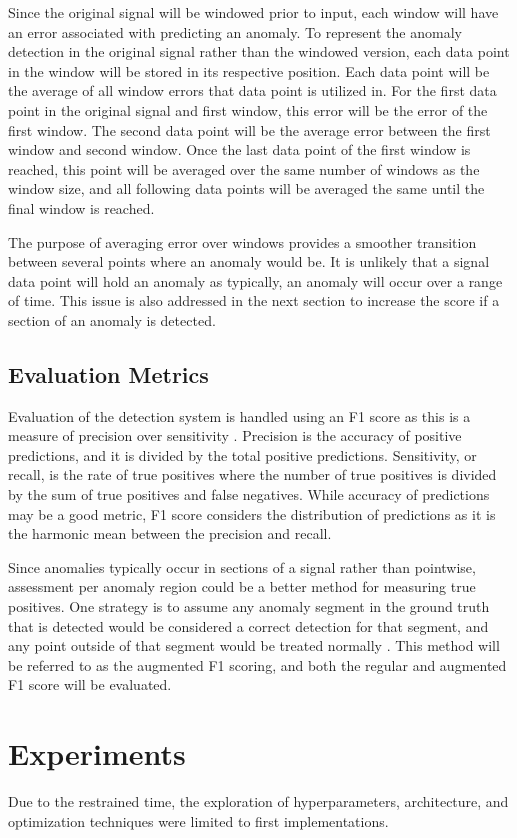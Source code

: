 \documentclass[conference]{IEEEtran}
\begin{document}
Since the original signal will be windowed prior to input, each window will have an error associated with predicting an anomaly. To represent the anomaly detection in the original signal rather than the windowed version, each data point in the window will be stored in its respective position. Each data point will be the average of all window errors that data point is utilized in. For the first data point in the original signal and first window, this error will be the error of the first window. The second data point will be the average error between the first window and second window. Once the last data point of the first window is reached, this point will be averaged over the same number of windows as the window size, and all following data points will be averaged the same until the final window is reached.

The purpose of averaging error over windows provides a smoother transition between several points where an anomaly would be. It is unlikely that a signal data point will hold an anomaly as typically, an anomaly will occur over a range of time. This issue is also addressed in the next section to increase the score if a section of an anomaly is detected.

\subsection{Evaluation Metrics}
Evaluation of the detection system is handled using an F1 score as this is a measure of precision over sensitivity \cite{f1_page}. Precision is the accuracy of positive predictions, and it is divided by the total positive predictions. Sensitivity, or recall, is the rate of true positives where the number of true positives is divided by the sum of true positives and false negatives. While accuracy of predictions may be a good metric, F1 score considers the distribution of predictions as it is the harmonic mean between the precision and recall.

Since anomalies typically occur in sections of a signal rather than pointwise, assessment per anomaly region could be a better method for measuring true positives. One strategy is to assume any anomaly segment in the ground truth that is detected would be considered a correct detection for that segment, and any point outside of that segment would be treated normally \cite{aug_score}. This method will be referred to as the augmented F1 scoring, and both the regular and augmented F1 score will be evaluated.

\section{Experiments}
Due to the restrained time, the exploration of hyperparameters, architecture, and optimization techniques were limited to first implementations. 
\end{document}
